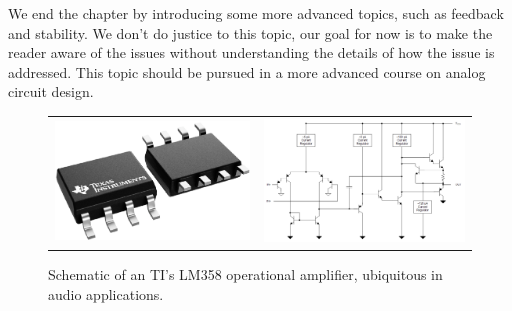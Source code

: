 We end the chapter by introducing some more advanced topics, such as feedback and stability.  We don't do justice to this topic, our goal for now is to make the reader aware of the issues without understanding the details of how the issue is addressed.  This topic should be pursued in a more advanced course on analog circuit design.
\begin{figure}[H]
\centering
\begin{tabular}{c c}
\includegraphics[scale=0.25]{tx_opamp} & \includegraphics[scale=0.4]{lm358}
\end{tabular}
\caption{Schematic of an TI's LM358 operational amplifier, ubiquitous in audio applications.}
\label{fig:ch17_intro}
\end{figure}
\newpage
